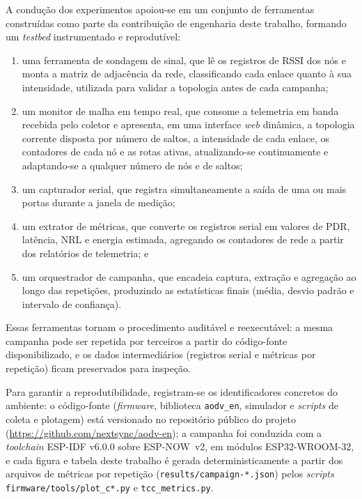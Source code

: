 A condução dos experimentos apoiou-se em um conjunto de ferramentas
construídas como parte da contribuição de engenharia deste trabalho,
formando um \emph{testbed} instrumentado e reprodutível:

\begin{enumerate}
\def\labelenumi{\alph{enumi})}
\tightlist
\item
  uma ferramenta de sondagem de sinal, que lê os registros de RSSI dos
  nós e monta a matriz de adjacência da rede, classificando cada enlace
  quanto à sua intensidade, utilizada para validar a topologia antes de
  cada campanha;
\item
  um monitor de malha em tempo real, que consome a telemetria em banda
  recebida pelo coletor e apresenta, em uma interface \emph{web}
  dinâmica, a topologia corrente disposta por número de saltos, a
  intensidade de cada enlace, os contadores de cada nó e as rotas
  ativas, atualizando-se continuamente e adaptando-se a qualquer número
  de nós e de saltos;
\item
  um capturador serial, que registra simultaneamente a saída de uma ou
  mais portas durante a janela de medição;
\item
  um extrator de métricas, que converte os registros serial em valores
  de PDR, latência, NRL e energia estimada, agregando os contadores de
  rede a partir dos relatórios de telemetria; e
\item
  um orquestrador de campanha, que encadeia captura, extração e
  agregação ao longo das repetições, produzindo as estatísticas finais
  (média, desvio padrão e intervalo de confiança).
\end{enumerate}

Essas ferramentas tornam o procedimento auditável e reexecutável: a
mesma campanha pode ser repetida por terceiros a partir do código-fonte
disponibilizado, e os dados intermediários (registros serial e métricas
por repetição) ficam preservados para inspeção.

Para garantir a reprodutibilidade, registram-se os identificadores
concretos do ambiente: o código-fonte (\emph{firmware}, biblioteca
\texttt{aodv\_en}, simulador e \emph{scripts} de coleta e plotagem) está
versionado no repositório público do projeto
(\url{https://github.com/nextsync/aodv-en}); a campanha foi conduzida com a
\emph{toolchain} ESP-IDF v6.0.0 sobre ESP-NOW~v2, em módulos ESP32-WROOM-32,
e cada figura e tabela deste trabalho é gerada deterministicamente a partir
dos arquivos de métricas por repetição (\texttt{results/campaign-*.json})
pelos \emph{scripts} \texttt{firmware/tools/plot\_c*.py} e
\texttt{tcc\_metrics.py}.

